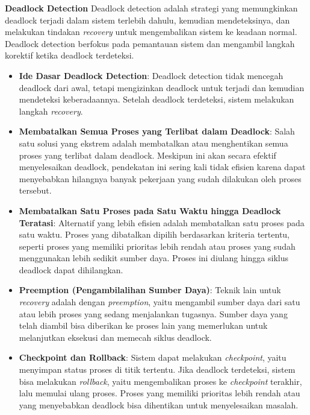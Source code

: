 \documentclass[12pt]{article}
\begin{document}
\begin{itemize}
\begin{itemize}
\end{itemize}
\textbf{Deadlock Detection} 
Deadlock detection adalah strategi yang memungkinkan deadlock terjadi dalam sistem terlebih dahulu, kemudian mendeteksinya, dan melakukan tindakan \textit{recovery} untuk mengembalikan sistem ke keadaan normal. Deadlock detection berfokus pada pemantauan sistem dan mengambil langkah korektif ketika deadlock terdeteksi.
\begin{itemize}
\item \textbf{Ide Dasar Deadlock Detection}: Deadlock detection tidak mencegah deadlock dari awal, tetapi mengizinkan deadlock untuk terjadi dan kemudian mendeteksi keberadaannya. Setelah deadlock terdeteksi, sistem melakukan langkah \textit{recovery}.
\item \textbf{Membatalkan Semua Proses yang Terlibat dalam Deadlock}: Salah satu solusi yang ekstrem adalah membatalkan atau menghentikan semua proses yang terlibat dalam deadlock. Meskipun ini akan secara efektif menyelesaikan deadlock, pendekatan ini sering kali tidak efisien karena dapat menyebabkan hilangnya banyak pekerjaan yang sudah dilakukan oleh proses tersebut.
\item \textbf{Membatalkan Satu Proses pada Satu Waktu hingga Deadlock Teratasi}: Alternatif yang lebih efisien adalah membatalkan satu proses pada satu waktu. Proses yang dibatalkan dipilih berdasarkan kriteria tertentu, seperti proses yang memiliki prioritas lebih rendah atau proses yang sudah menggunakan lebih sedikit sumber daya. Proses ini diulang hingga siklus deadlock dapat dihilangkan.
\item \textbf{Preemption (Pengambilalihan Sumber Daya)}: Teknik lain untuk \textit{recovery} adalah dengan \textit{preemption}, yaitu mengambil sumber daya dari satu atau lebih proses yang sedang menjalankan tugasnya. Sumber daya yang telah diambil bisa diberikan ke proses lain yang memerlukan untuk melanjutkan eksekusi dan memecah siklus deadlock.
\item \textbf{Checkpoint dan Rollback}: Sistem dapat melakukan \textit{checkpoint}, yaitu menyimpan status proses di titik tertentu. Jika deadlock terdeteksi, sistem bisa melakukan \textit{rollback}, yaitu mengembalikan proses ke \textit{checkpoint} terakhir, lalu memulai ulang proses. Proses yang memiliki prioritas lebih rendah atau yang menyebabkan deadlock bisa dihentikan untuk menyelesaikan masalah.
\end{itemize}

\end{itemize}
\end{document}
